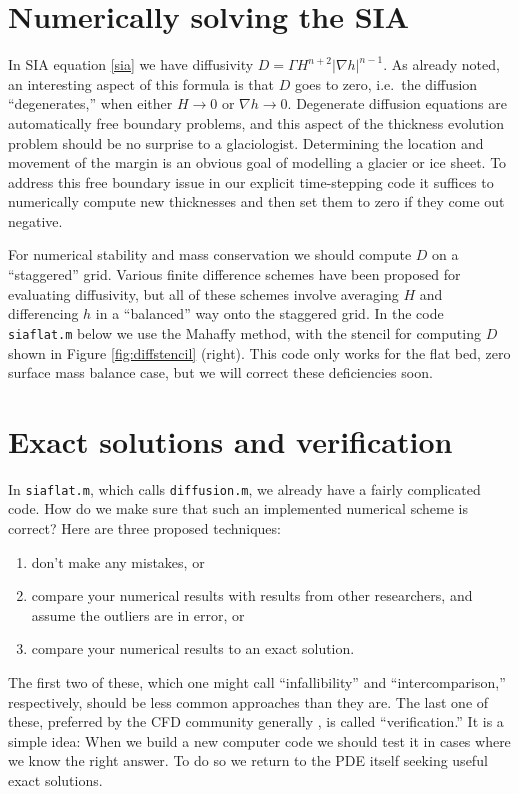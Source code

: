 \documentclass[letterpaper,final,12pt,reqno]{amsart}
\newcommand{\grad}{\nabla}
\newcommand{\minput}[1]{
\vspace{0.8cm}
\VerbatimInput[frame=single,framesep=3mm,label=\fbox{\normalsize \textsl{\,#1.m\,}},fontfamily=courier,fontsize=\footnotesize]{tmp/#1.slim.m}
\vspace{0.5cm}
}
\begin{document}
\section{Numerically solving the SIA} \label{sec:numericalsia}

In SIA equation \eqref{sia} we have diffusivity $D = \Gamma H^{n+2} |\grad h|^{n-1}$.  As already noted, an interesting aspect of this formula is that $D$ goes to zero, i.e.~the diffusion ``degenerates,'' when either $H\to 0$ or $\grad h \to 0$.  Degenerate diffusion equations are automatically free boundary problems, and this aspect of the thickness evolution problem should be no surprise to a glaciologist.  Determining the location and movement of the margin is an obvious goal of modelling a glacier or ice sheet.  To address this free boundary issue in our explicit time-stepping code it suffices to numerically compute new thicknesses and then set them to zero if they come out negative.

For numerical stability and mass conservation we should compute $D$ on a ``staggered'' grid.  Various finite difference schemes have been proposed for evaluating diffusivity, but all of these schemes involve averaging $H$ and differencing $h$ in a ``balanced'' way onto the staggered grid.  In the code \texttt{siaflat.m} below we use the Mahaffy \cite{Mahaffy} method, with the stencil for computing $D$ shown in Figure \ref{fig:diffstencil} (right).  This code only works for the flat bed, zero surface mass balance case, but we will correct these deficiencies soon.

\minput{siaflat}


\section{Exact solutions and verification} \label{sec:exactsolutions}

In \texttt{siaflat.m}, which calls \texttt{diffusion.m}, we already have a fairly complicated code.  How do we make sure that such an implemented numerical scheme is correct?  Here are three proposed techniques:
\begin{enumerate}
  \item don't make any mistakes, or
  \item compare your numerical results with results from other researchers, and assume the outliers are in error, or
  \item compare your numerical results to an exact solution.   \end{enumerate}
The first two of these, which one might call ``infallibility'' and ``intercomparison,'' respectively, should be less common approaches than they are.  The last one of these, preferred by the CFD community generally \cite{Wesseling}, is called ``verification.''  It is a simple idea:  When we build a new computer code we should test it in cases where we know the right answer.  To do so we return to the PDE itself seeking useful exact solutions.
\end{document}
